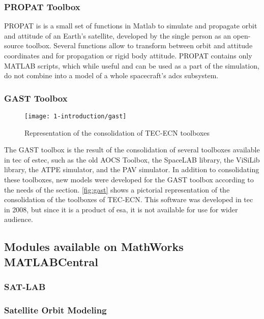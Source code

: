     \subsubsection{PROPAT Toolbox}
        PROPAT is is a small set of functions in Matlab to simulate and propagate orbit and attitude of an Earth's satellite, developed by the single person as an open-source toolbox. Several functions allow to transform between orbit and attitude coordinates and for propagation or rigid body attitude. PROPAT contains only MATLAB scripts, which while useful and can be used as a part of the simulation, do not combine into a model of a whole spacecraft's \ac{adcs} subsystem.

    \subsubsection{GAST Toolbox}
        \begin{figure}[H]
            \centering
            \texttt{[image: 1-introduction/gast]}
            \caption{Representation of the consolidation of TEC-ECN toolboxes}
            \label{fig:gast}
        \end{figure}

        The GAST toolbox is the result of the consolidation of several toolboxes available in \ac{tec} of \ac{estec}, such as the old AOCS Toolbox, the SpaceLAB library, the ViSiLib library, the ATPE simulator, and the PAV simulator. In addition to consolidating these toolboxes, new models were developed for the GAST toolbox according to the needs of the section. \autoref{fig:gast} shows a pictorial representation of the consolidation of the toolboxes of TEC-ECN. This software was developed in \ac{tec} in 2008, but since it is a product of \ac{esa}, it is not available for use for wider audience.

    \subsection{Modules available on MathWorks MATLABCentral}
    \subsubsection{SAT-LAB}
    \subsubsection{Satellite Orbit Modeling}
